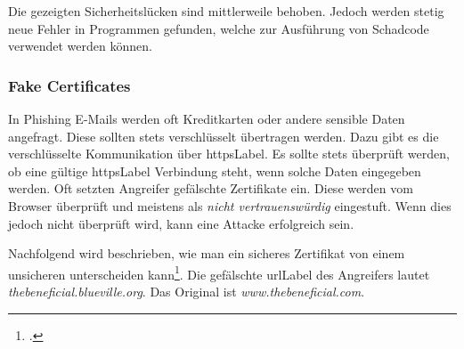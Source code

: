 Die gezeigten Sicherheitslücken sind mittlerweile behoben. Jedoch werden stetig neue Fehler in Programmen gefunden, welche zur Ausführung von Schadcode verwendet werden können.

\subsubsection{Fake Certificates}
In Phishing E-Mails werden oft Kreditkarten oder andere sensible Daten angefragt. Diese sollten stets verschlüsselt übertragen werden. Dazu gibt es die verschlüsselte Kommunikation über \Gls{httpsLabel}. Es sollte stets überprüft werden, ob eine gültige \Gls{httpsLabel} Verbindung steht, wenn solche Daten eingegeben werden. Oft setzten Angreifer gefälschte Zertifikate ein. Diese werden vom Browser überprüft und meistens als \textit{nicht vertrauenswürdig} eingestuft. Wenn dies jedoch nicht überprüft wird, kann eine Attacke erfolgreich sein.

Nachfolgend wird beschrieben, wie man ein sicheres Zertifikat von einem unsicheren unterscheiden kann\footcite{Phishing_and_Certificates_2015-05-23}. Die gefälschte \Gls{urlLabel} des Angreifers lautet \textit{thebeneficial.blueville.org}. Das Original ist \textit{www.thebeneficial.com}.

